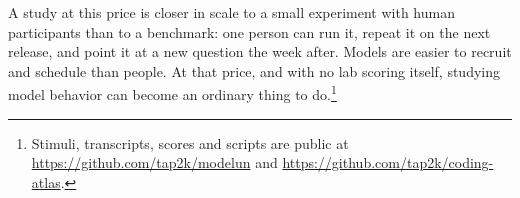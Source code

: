 A study at this price is closer in scale to a small experiment with human participants than to a benchmark: one person can run it, repeat it on the next release, and point it at a new question the week after. Models are easier to recruit and schedule than people. At that price, and with no lab scoring itself, studying model behavior can become an ordinary thing to do.\footnote{Stimuli, transcripts, scores and scripts are public at \url{https://github.com/tap2k/modelun} and \url{https://github.com/tap2k/coding-atlas}.}
